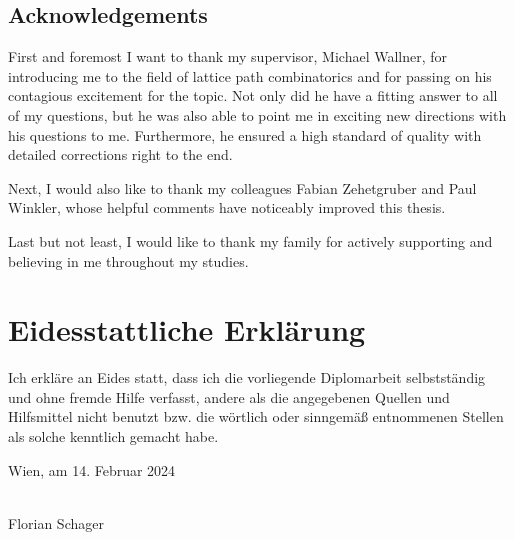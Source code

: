 \section*{Acknowledgements}

First and foremost I want to thank my supervisor, Michael Wallner,
for introducing me to the field of lattice path combinatorics and for passing on his contagious excitement for the topic.
Not only did he have a fitting answer to all of my questions, but he was also able to point me in exciting new directions with his questions to me. Furthermore, he ensured a high standard of quality with detailed corrections right to the end.

Next, I would also like to thank my colleagues Fabian Zehetgruber and Paul Winkler, whose helpful comments have noticeably improved this thesis.

Last but not least, I would like to thank my family for actively supporting and believing in me throughout my studies.

\cleardoublepage

\chapter*{Eidesstattliche Erklärung}
\thispagestyle{empty}
\thispagestyle{empty}

\vspace*{2cm}

Ich erkläre an Eides statt, dass ich die vorliegende Diplomarbeit selbstständig und ohne fremde Hilfe verfasst, andere als die angegebenen Quellen und Hilfsmittel nicht benutzt bzw. die wörtlich oder sinngemäß entnommenen Stellen als solche kenntlich gemacht habe.

\vspace*{3cm}

\noindent
Wien, am 14. Februar 2024
%
\hfill 
%
\begin{minipage}[t]{5cm}
\centering
\underline{\hspace*{5cm}} \\
\small Florian Schager
\end{minipage}

\cleardoublepage


\tableofcontents
\listoftodos

\cleardoublepage
{} 